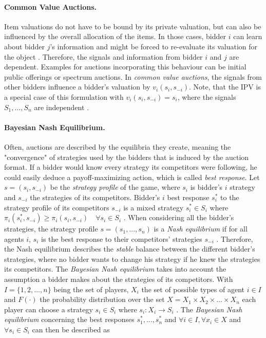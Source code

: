 \paragraph{Common Value Auctions.}
Item valuations do not have to be bound by its private valuation, but can also be influenced by the overall allocation of the items. In those cases, bidder $ i $ can learn about bidder $ j $'s information and might be forced to re-evaluate its valuation for the object \cite[p. 8]{Levin2004}. Therefore, the signals and information from bidder $ i $ and $ j $ are dependent. Examples for auctions incorporating this behaviour can be initial public offerings or spectrum auctions. In \textit{common value auctions}, the signals from other bidders influence a bidder's valuation by $ v_i(s_i, s_{-i}) $. Note, that the IPV is a special case of this formulation with $ v_i(s_i, s_{-i}) = s_i $, where the signals $ S_1,..., S_n $ are independent \cite[p. 8]{Levin2004}.

\paragraph{Bayesian Nash Equilibrium.}
Often, auctions are described by the equilibria they create, meaning the "convergence" of strategies used by the bidders that is induced by the auction format. If a bidder would know every strategy its competitors were following, he could easily deduce a payoff-maximizing action, which is called \textit{best response}. Let $ s = (s_i, s_{-i}) $ be the \textit{strategy profile} of the game, where $ s_i $ is bidder's $ i $ strategy and $ s_{-i} $  the strategies of its competitors. Bidder's $ i $ best response $ s_i^* $ to the strategy profile of its competitors $ s_{-i} $ is a mixed strategy $ s_i^* \in S_i $ where $ \pi_i (s_i^*, s_{-i}) \geq \pi_i (s_i, s_{-i}) \quad \forall s_i \in S_i $ \cite[p. 62]{Leyton-Brown2008}. When considering all the bidder's strategies, the strategy profile $ s = (s_1, ..., s_n) $ is a \textit{Nash equilibrium} if for all agents $ i $, $ s_i $ is the best response to their competitors' strategies $ s_{-i} $ \cite[p. 62]{Leyton-Brown2008}. Therefore, the Nash equilibrium describes the \textit{stable} balance between the different bidder's strategies, where no bidder wants to change his strategy if he knew the strategies its competitors.
The \textit{Bayesian Nash equilibrium} takes into account the assumption a bidder makes about the strategies of its competitors. With $ I = \{1, 2, ..., n\} $ being the set of players, $ X_i $ the set of possible types of agent $ i \in I $ and $ F(\cdot) $ the probability distribution over the set $ X = X_1 \times X_2 \times ... \times X_n $ each player can choose a strategy $ s_i \in S_i $ where $ s_i: X_i \to S_i $ \cite[p. 6 f.]{Menezes2005}. The \textit{Bayesian Nash equilibrium} concerning the best responses $ s_1^*, ..., s_n^*$ and $ \forall i \in I, \forall x_i \in X $ and $ \forall s_i \in S_i $ can then be described as

